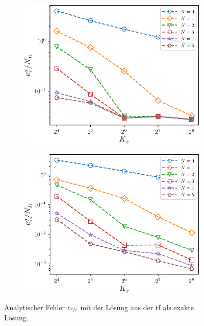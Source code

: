\begin{figure}
    \centering
    \begin{subfigure}[b]{0.48\textwidth}
        \centering
        \includegraphics[width=\textwidth]{plots/test3/real_GL1.pdf}
        \label{fig:rates1_1}
    \end{subfigure}
    \hfill
    \begin{subfigure}[b]{0.48\textwidth}
        \centering
        \includegraphics[width=\textwidth]{plots/test3/imag_GL1.pdf}
        \label{fig:rates1_2}
    \end{subfigure}
    \caption[]
    {Analytischer Fehler $e_{\nicefrac{r}{i}}$ mit der Lösung aus der \ac{tf} als exakte Lösung.}
    \label{fig:rates1}
\end{figure}
